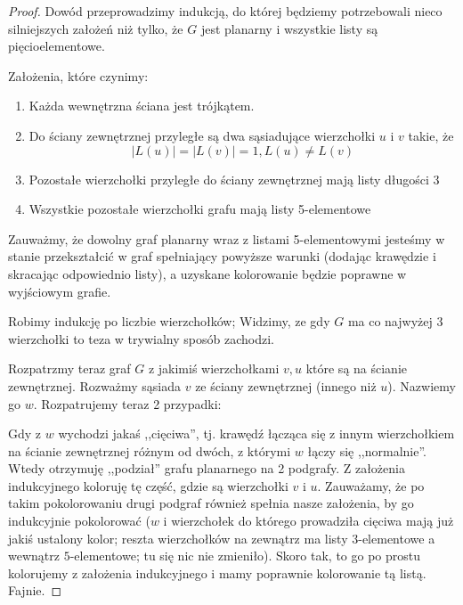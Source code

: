 \begin{proof}
	Dowód przeprowadzimy indukcją, do której będziemy potrzebowali nieco silniejszych założeń niż tylko, że $G$ jest planarny i wszystkie listy są pięcioelementowe.

	Założenia, które czynimy:
	\begin{enumerate}
		\item Każda wewnętrzna ściana jest trójkątem.
		\item Do ściany zewnętrznej przyległe są dwa sąsiadujące wierzchołki $u$ i $v$ takie, że
		      $$ |L(u)| = |L(v)| = 1, L(u) \neq L(v) $$
		\item Pozostałe wierzchołki przyległe do ściany zewnętrznej mają listy długości 3
		\item Wszystkie pozostałe wierzchołki grafu mają listy 5-elementowe
	\end{enumerate}

	Zauważmy, że dowolny graf planarny wraz z listami 5-elementowymi jesteśmy w stanie przekształcić w graf spełniający powyższe warunki (dodając krawędzie i skracając odpowiednio listy), a uzyskane kolorowanie będzie poprawne w wyjściowym grafie.

	Robimy indukcję po liczbie wierzchołków; Widzimy, ze gdy $G$ ma co najwyżej 3 wierzchołki to teza w trywialny sposób zachodzi.

	Rozpatrzmy teraz graf $G$ z jakimiś wierzchołkami $v, u$ które są na ścianie zewnętrznej. Rozważmy sąsiada $v$ ze ściany zewnętrznej (innego niż $u$). Nazwiemy go $w$. Rozpatrujemy teraz 2 przypadki:

	Gdy z $w$ wychodzi jakaś ,,cięciwa'', tj. krawędź łącząca się z innym wierzchołkiem na ścianie zewnętrznej różnym od dwóch, z którymi $w$ łączy się ,,normalnie''. Wtedy otrzymuję ,,podział'' grafu planarnego na 2 podgrafy. Z założenia indukcyjnego koloruję tę część, gdzie są wierzchołki $v$ i $u$. Zauważamy, że po takim pokolorowaniu drugi podgraf również spełnia nasze założenia, by go indukcyjnie pokolorować ($w$ i wierzchołek do którego prowadziła cięciwa mają już jakiś ustalony kolor; reszta wierzchołków na zewnątrz ma listy $3$-elementowe a wewnątrz $5$-elementowe; tu się nic nie zmieniło). Skoro tak, to go po prostu kolorujemy z założenia indukcyjnego i mamy poprawnie kolorowanie tą listą. Fajnie.


\end{proof}
